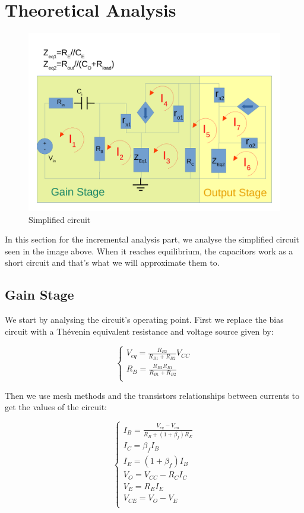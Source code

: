 \section{Theoretical Analysis}
\label{sec:analysis}

\begin{figure}[H] \centering
\includegraphics[width=0.7\linewidth]{../doc/circuit_freq.pdf}
\caption{Simplified circuit}
\label{fig:simp_cir}
\end{figure}

In this section for the incremental analysis part, we analyse the simplified circuit seen in the image above. When it reaches equilibrium, the capacitors work as a short circuit and that's what we will approximate them to.

\subsection{Gain Stage}
We start by analysing the circuit's operating point.
First we replace the bias circuit with a Thévenin equivalent resistance and voltage source given by:

\begin{equation}\label{eq:v_eq}
\begin{cases}
V_{eq}=\frac{R_{B2}}{R_{B1}+R_{B2}} V_{CC} \\
R_B=\frac{R_{B2}R_{B1}}{R_{B1}+R_{B2}}\\
\end{cases}
\end{equation}

Then we use mesh methods and the transistors relationships between currents to get the values of the circuit:

\begin{equation}\label{eq:Op1}
\begin{cases}
I_B=\frac{V_{eq}-V_{on}}{R_B+(1+\beta_f)R_{E}}\\
I_C=\beta_f I_B\\
I_E=(1+\beta_f)I_B\\
V_O=V_{CC}-R_C I_C\\
V_E=R_E I_E\\
V_{CE}=V_O-V_E\\
\end{cases}
\end{equation}

